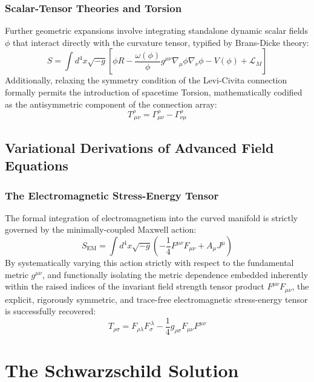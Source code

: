 \documentclass[11pt, a4paper]{report}
\begin{document}
\subsection{Scalar-Tensor Theories and Torsion}
Further geometric expansions involve integrating standalone dynamic scalar fields $\phi$ that interact directly with the curvature tensor, typified by Brans-Dicke theory:
\begin{equation}
S = \int d^{4}x \sqrt{-g} \left[ \phi R - \frac{\omega(\phi)}{\phi} g^{\mu\nu}\nabla_{\mu}\phi\nabla_{\nu}\phi - V(\phi) + \mathcal{L}_{M} \right]
\end{equation}
Additionally, relaxing the symmetry condition of the Levi-Civita connection formally permits the introduction of spacetime Torsion, mathematically codified as the antisymmetric component of the connection array:
\begin{equation}
T^{\rho}_{\ \mu\nu} = \Gamma^{\rho}_{\mu\nu} - \Gamma^{\rho}_{\nu\mu}
\end{equation}

\section{Variational Derivations of Advanced Field Equations}
\subsection{The Electromagnetic Stress-Energy Tensor}
The formal integration of electromagnetism into the curved manifold is strictly governed by the minimally-coupled Maxwell action:
\begin{equation}
\label{eq:em_action}
S_{\text{EM}} = \int d^{4}x \sqrt{-g} \left( -\frac{1}{4} F^{\mu\nu}F_{\mu\nu} + A_{\mu}J^{\mu} \right)
\end{equation}
By systematically varying this action strictly with respect to the fundamental metric $g^{\mu\nu}$, and functionally isolating the metric dependence embedded inherently within the raised indices of the invariant field strength tensor product $F^{\mu\nu}F_{\mu\nu}$, the explicit, rigorously symmetric, and trace-free electromagnetic stress-energy tensor is successfully recovered:
\begin{equation}
\label{eq:em_tensor_derived}
T_{\rho\sigma} = F_{\rho\lambda}F_{\sigma}^{\ \lambda} - \frac{1}{4} g_{\rho\sigma} F_{\mu\nu}F^{\mu\nu}
\end{equation}

\chapter{The Schwarzschild Solution}
\end{document}
